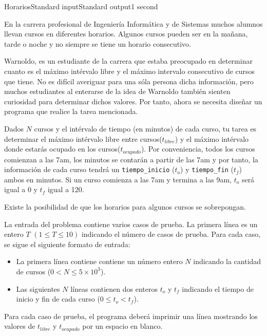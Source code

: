 \begin{problem}{Horarios}{Standard input}{Standard output}{1 second}{}


En la carrera profesional de Ingeniería Informática y de Sistemas muchos alumnos llevan cursos en diferentes horarios. Algunos cursos pueden ser en la mañana, tarde o noche y no siempre se tiene un horario consecutivo.

Warnoldo, es un estudiante de la carrera que estaba preocupado en determinar cuanto es el máximo intérvalo libre y el máximo intervalo consecutivo de cursos que tiene. No es difícil averiguar para una sóla persona dicha información, pero muchos estudiantes al enterarse de la idea de Warnoldo también sienten curiosidad para determinar dichos valores. Por tanto, ahora se necesita diseñar un programa que realice la tarea mencionada.

Dados $N$ cursos y el intérvalo de tiempo (en minutos) de cada curso, tu tarea es determinar el máximo intérvalo libre entre cursos($t_{libre}$) y el máximo intérvalo donde estarás ocupado en los cursos($t_{ocupado}$). Por conveniencia, todos los cursos comienzan a las 7am, los minutos se contarán a partir de las 7am y por tanto, la información de cada curso tendrá un \texttt{tiempo\_inicio} ($t_o$) y \texttt{tiempo\_fin} ($t_f$) ambos en minutos. Si un curso comienza a las 7am y termina a las 9am, $t_o$ será igual a 0 y $t_f$ igual a 120.  

Existe la posibilidad de que los horarios para algunos cursos se sobrepongan.

\InputFile
La entrada del problema contiene varios casos de prueba. La primera línea es un entero $T$ $(1\leq T \leq 10)$ indicando el número de casos de prueba. Para cada caso, se sigue el siguiente formato de entrada:

\begin{itemize}
\item La primera línea contiene contiene un número entero $N$ indicando la cantidad de cursos ($0<N\leq 5\times10^3$).

\item Las siguientes $N$ líneas contienen dos enteros $t_o$ y $t_f$ indicando el tiempo de inicio y fin de cada curso ($0 \leq t_o < t_f$).
\end{itemize}

\OutputFile
Para cada caso de prueba, el programa deber\'a imprimir una línea mostrando los valores de $t_{libre}$ y $t_{ocupado}$ por un espacio en blanco.

\Example

\begin{example}
\end{example}

\end{problem}
